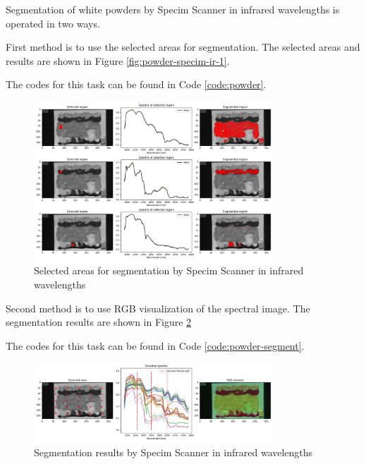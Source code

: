 Segmentation of white powders by Specim Scanner in infrared wavelengths is operated in two ways.

First method is to use the selected areas for segmentation. The selected areas and results are shown in Figure \ref{fig:powder-specim-ir-1}. 

The codes for this task can be found in Code \ref{code:powder}.

\begin{figure}[H]
  \centering
  \includegraphics[width=0.8\textwidth]{./fig/task3/powder.png}
  \caption{Selected areas for segmentation by Specim Scanner in infrared wavelengths}
  \label{fig:powder}
\end{figure}

Second method is to use RGB visualization of the spectral image. The segmentation results are shown in Figure \ref{fig:powder-seg}

The codes for this task can be found in Code \ref{code:powder-segment}.

\begin{figure}[H]
  \centering
  \includegraphics[width=0.8\textwidth]{./fig/task3/powder-segment.png}
  \caption{Segmentation results by Specim Scanner in infrared wavelengths}
  \label{fig:powder-seg}
\end{figure}
